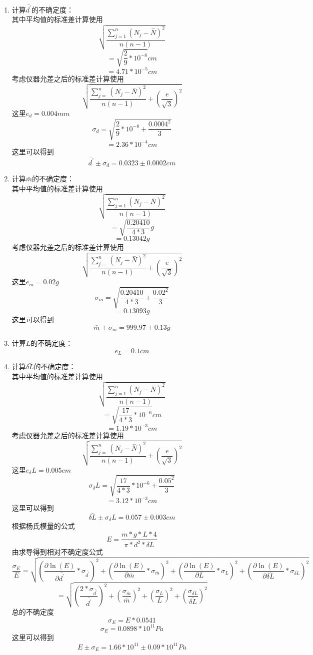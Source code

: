 \documentclass[a4paper,11pt]{article}
\begin{document}
\begin{enumerate}
	\item 计算$\bar{d^{\prime}}$的不确定度：\\
	其中平均值的标准差计算使用$$ \sqrt{\frac{\sum _{j=1}^{n}{\left({N}_{j}-\stackrel{-}{N}\right)}^{2}}{n\left(n-1\right)}} $$
	$$ = \sqrt{\frac{2}{9} * 10^{-8}} cm $$
	$$ = 4.71 * 10^{-5} cm $$
	考虑仪器允差之后的标准差计算使用$$\sqrt{\frac{\sum _{j=}^{n}{\left({N}_{j}-\stackrel{-}{N}\right)}^{2}}{n\left(n-1\right)}+{\left(\frac{e}{\sqrt{3}}\right)}^{2}}$$
	这里$ e_d = 0.004 mm $
	$$\sigma_d = \sqrt{\frac{2}{9} * 10^{-8} + \frac{0.0004^2}{3}} $$
	$$ = 2.36 * 10^{-4} cm $$
	这里可以得到
	$$ \bar{d^{\prime}} \pm \sigma_d = 0.0323 \pm 0.0002 cm $$
	
	\item 计算$\bar{m}$的不确定度：\\
	其中平均值的标准差计算使用$$ \sqrt{\frac{\sum _{j=1}^{n}{\left({N}_{j}-\stackrel{-}{N}\right)}^{2}}{n\left(n-1\right)}} $$
	$$ = \sqrt{\frac{0.20410}{4 *3} } g $$
	$$ = 0.13042 g $$
	考虑仪器允差之后的标准差计算使用$$\sqrt{\frac{\sum _{j=}^{n}{\left({N}_{j}-\stackrel{-}{N}\right)}^{2}}{n\left(n-1\right)}+{\left(\frac{e}{\sqrt{3}}\right)}^{2}}$$
	这里$ e_m = 0.02 g $
	$$\sigma_m = \sqrt{\frac{0.20410}{4 *3} + \frac{0.02^2}{3}} $$
	$$ = 0.13093 g $$
	这里可以得到
	$$ \bar{m} \pm \sigma_m = 999.97 \pm 0.13 g $$
	
	\item 计算$L$的不确定度：\\
	$$ e_{L} = 0.1 cm $$
	
	\item 计算$\bar{\delta L}$的不确定度：\\
	其中平均值的标准差计算使用$$ \sqrt{\frac{\sum _{j=1}^{n}{\left({N}_{j}-\stackrel{-}{N}\right)}^{2}}{n\left(n-1\right)}} $$
	$$ = \sqrt{\frac{17}{4 *3} * 10^{-6} } cm $$
	$$ = 1.19 * 10^{-3} cm $$
	考虑仪器允差之后的标准差计算使用$$\sqrt{\frac{\sum _{j=}^{n}{\left({N}_{j}-\stackrel{-}{N}\right)}^{2}}{n\left(n-1\right)}+{\left(\frac{e}{\sqrt{3}}\right)}^{2}}$$
	这里$ e_\delta L = 0.005 cm $
	$$\sigma_\delta L = \sqrt{\frac{17}{4 *3} * 10^{-6} + \frac{0.05^2}{3}} $$
	$$ = 3.12 * 10^{-3} cm $$
	这里可以得到
	$$ \bar{\delta L} \pm \sigma_\delta L = 0.057 \pm 0.003 cm $$
	根据杨氏模量的公式
	$$ E = \dfrac{m*g * L * 4}{\pi * d^2 * \delta L } $$
	由求导得到相对不确定度公式
	$$ \dfrac{\sigma_{E}}{E} = \sqrt{(\dfrac{\partial \ln(E)}{\partial \bar{d^{\prime}}} * \sigma_{\bar{d^{\prime}}})^{2} + (\dfrac{\partial \ln(E)}{\partial \bar{m}} * \sigma_{\bar{m}})^{2} + (\dfrac{\partial \ln(E)}{\partial L} * \sigma_{L})^{2} + (\dfrac{\partial \ln(E)}{\partial \bar{\delta L}} * \sigma_{\bar{\delta L}})^{2} } $$
	$$ = \sqrt{(\dfrac{2 * \sigma_{\bar{d^{\prime}}}}{\bar{d^{\prime}}})^{2} + (\dfrac{\sigma_{\bar{m}}}{\bar{m}})^{2}  + (\dfrac{\sigma_{L}}{L})^{2}  + (\dfrac{\sigma_{\bar{\delta L}}}{\bar{\delta L}})^{2}  } $$
	总的不确定度
	$$ \sigma_{E} = E * 0.0541  $$
	$$ \sigma_{E} = 0.0898 * 10^{11} Pa $$
	这里可以得到
	$$ E\pm \sigma_E = 1.66 * 10^{11} \pm 0.09 * 10^{11} Pa $$ 
	

\end{enumerate}
\end{document}
